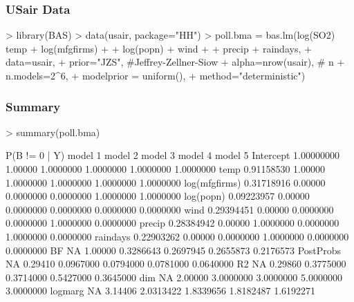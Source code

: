 \documentclass[]{beamer}
\begin{document}
\begin{frame}[fragile]
\frametitle{USair Data}
\begin{Schunk}
\begin{Sinput}
> library(BAS)
> data(usair, package="HH")
> poll.bma = bas.lm(log(SO2) ~ temp + log(mfgfirms) +
+                              log(popn) + wind +
+                              precip + raindays,
+                   data=usair,
+                   prior="JZS",  #Jeffrey-Zellner-Siow
+                   alpha=nrow(usair), # n
+                   n.models=2^6,
+                   modelprior = uniform(),
+                   method="deterministic")
\end{Sinput}
\end{Schunk}


\end{frame}


\begin{frame}[fragile]\frametitle{Summary}

\begin{small}
\begin{Schunk}
\begin{Sinput}
> summary(poll.bma)
\end{Sinput}
\begin{Soutput}
              P(B != 0 | Y) model 1   model 2   model 3   model 4   model 5
Intercept        1.00000000 1.00000 1.0000000 1.0000000 1.0000000 1.0000000
temp             0.91158530 1.00000 1.0000000 1.0000000 1.0000000 1.0000000
log(mfgfirms)    0.31718916 0.00000 0.0000000 0.0000000 1.0000000 1.0000000
log(popn)        0.09223957 0.00000 0.0000000 0.0000000 0.0000000 0.0000000
wind             0.29394451 0.00000 0.0000000 0.0000000 1.0000000 0.0000000
precip           0.28384942 0.00000 1.0000000 0.0000000 1.0000000 0.0000000
raindays         0.22903262 0.00000 0.0000000 1.0000000 0.0000000 0.0000000
BF                       NA 1.00000 0.3286643 0.2697945 0.2655873 0.2176573
PostProbs                NA 0.29410 0.0967000 0.0794000 0.0781000 0.0640000
R2                       NA 0.29860 0.3775000 0.3714000 0.5427000 0.3645000
dim                      NA 2.00000 3.0000000 3.0000000 5.0000000 3.0000000
logmarg                  NA 3.14406 2.0313422 1.8339656 1.8182487 1.6192271
\end{Soutput}
\end{Schunk}
\end{small}

\end{frame}
\end{document}
